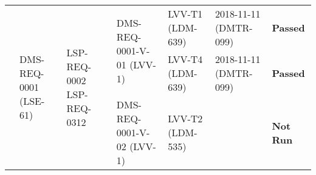 \begin{longtable}[]{|p{1.5cm}|p{2.7cm}|p{1.5cm}|p{3.2cm}|p{1.5cm}|p{1.7cm}|p{1.5cm}|}
\multirow{3}{*}{} &
\multirow{3}{*}{
\begin{minipage}[t]{0.9\columnwidth}
{\small DMS-REQ-0001}\newline
{\scriptsize (LSE-61)}
\end{minipage}} &
\multirow{3}{*}{
\begin{minipage}[t]{0.9\columnwidth}
{\tiny LSP-REQ-0002 \newline LSP-REQ-0312 }
\end{minipage}} &
\multirow{2}{*}{
\begin{minipage}[t]{0.9\columnwidth}
{\small DMS-REQ-0001-V-01}\newline
{\scriptsize (LVV-1)}
\end{minipage}} &
\begin{minipage}[t]{0.9\columnwidth}
{\small LVV-T1}\newline
{\scriptsize (LDM-639)}
\end{minipage} &
\begin{minipage}[t]{0.9\columnwidth}
{\small 2018-11-11}\newline
{\scriptsize (DMTR-099)}
\end{minipage} &
{\small \bf Passed} \\ \cline{5-7}
 & & & &
\begin{minipage}[t]{0.9\columnwidth}
{\small LVV-T4}\newline
{\scriptsize (LDM-639)}
\end{minipage} &
\begin{minipage}[t]{0.9\columnwidth}
{\small 2018-11-11}\newline
{\scriptsize (DMTR-099)}
\end{minipage} &
{\small \bf Passed} \\\cline{4-7}
 & & &
\multirow{1}{*}{
\begin{minipage}[t]{0.9\columnwidth}
{\small DMS-REQ-0001-V-02}\newline
{\scriptsize (LVV-1)}
\end{minipage} }&
\begin{minipage}[t]{0.9\columnwidth}
{\small LVV-T2}\newline
{\scriptsize (LDM-535)}
\end{minipage} &
 &
{\small \bf Not Run}
\\\hline


\end{longtable}
